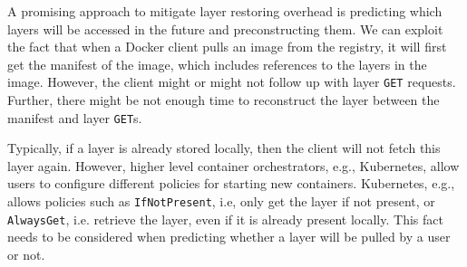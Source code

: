 %
%
A promising approach to mitigate layer restoring overhead is predicting which layers will be accessed in the future and preconstructing them.
%
%
%
We can exploit the fact that when a Docker client pulls an image
from the registry, it will first get the manifest of the
image, which includes references to the layers in the image.
%
%
%
%
However, the client might or might not follow up with layer \texttt{GET} requests.
%
Further, there might be not enough time to reconstruct the layer
between the manifest and layer \texttt{GET}s.


%
Typically, if a layer is already stored locally, then the client will not
fetch this layer again.
%
However, higher level container orchestrators, e.g., Kubernetes, allow users to configure different policies
for starting new containers. Kubernetes, e.g., allows policies such as
\texttt{IfNotPresent}, i.e,  only get the layer if not present, or \texttt{AlwaysGet}, i.e.
retrieve the layer, even if it is already present locally.
%
This fact needs to be considered when predicting whether a layer will
be pulled by a user or not.

